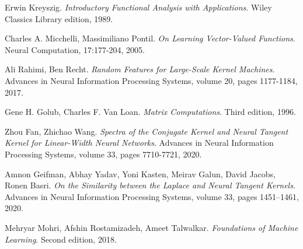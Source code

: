 \documentclass[11pt, a4paper]{article}
\begin{document}
\begin{thebibliography}{999}
 Erwin Kreyszig. \textit{Introductory Functional Analysis with Applications}. Wiley Classics Library edition, 1989.

 Charles A. Micchelli, Massimiliano Pontil. \textit{On Learning Vector-Valued Functions}. Neural Computation, 17:177-204, 2005.

 Ali Rahimi, Ben Recht. \textit{Random Features for Large-Scale Kernel Machines}. Advances in Neural Information Processing Systems, volume 20, pages 1177-1184, 2017.

 Gene H. Golub, Charles F. Van Loan. \textit{Matrix Computations}. Third edition, 1996.

 Zhou Fan, Zhichao Wang. \textit{Spectra of the Conjugate Kernel and Neural Tangent Kernel for Linear-Width Neural Networks}. Advances in Neural Information Processing Systems, volume 33, pages 7710-7721, 2020.

 Amnon Geifman, Abhay Yadav, Yoni Kasten, Meirav Galun, David Jacobs, Ronen Basri. \textit{On the Similarity between the Laplace and Neural Tangent Kernels}. Advances in Neural Information Processing Systems, volume 33,  pages 1451–1461, 2020.

 Mehryar Mohri, Afshin Rostamizadeh, Ameet Talwalkar. \textit{Foundations of Machine Learning}. Second edition, 2018.

\end{thebibliography}
\end{document}
